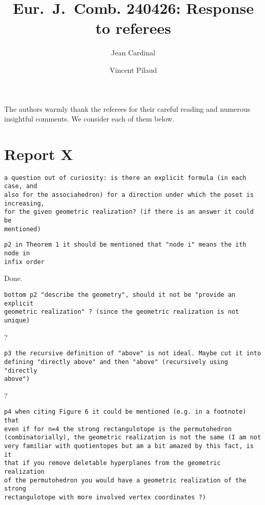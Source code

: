 \documentclass{article}
\title{Eur.~J.~Comb. 240426: Response to referees}
\author{Jean Cardinal \and Vincent Pilaud}
\begin{document}
\maketitle

The authors warmly thank the referees for their careful reading and numerous insightful comments. We consider each of them below.

\section{Report X}

\begin{verbatim}
a question out of curiosity: is there an explicit formula (in each case, and 
also for the associahedron) for a direction under which the poset is increasing, 
for the given geometric realization? (if there is an answer it could be 
mentioned)
\end{verbatim}

\begin{verbatim}
p2 in Theorem 1 it should be mentioned that "node i" means the ith node in 
infix order
\end{verbatim}

Done.

\begin{verbatim}
bottom p2 "describe the geometry", should it not be "provide an explicit 
geometric realization" ? (since the geometric realization is not unique)
\end{verbatim}

?

\begin{verbatim}
p3 the recursive definition of "above" is not ideal. Maybe cut it into 
defining "directly above" and then "above" (recursively using "directly 
above")
\end{verbatim}

?

\begin{verbatim}
p4 when citing Figure 6 it could be mentioned (e.g. in a footnote) that 
even if for n=4 the strong rectangulotope is the permutohedron 
(combinatorially), the geometric realization is not the same (I am not 
very familiar with quotientopes but am a bit amazed by this fact, is it 
that if you remove deletable hyperplanes from the geometric realization 
of the permutohedron you would have a geometric realization of the strong 
rectangulotope with more involved vertex coordinates ?)
\end{verbatim}
\end{document}
